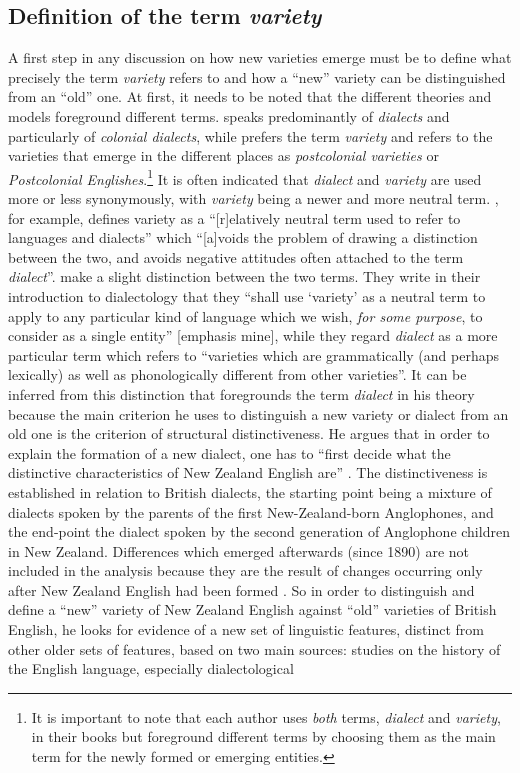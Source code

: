\subsection{Definition of the term \textit{variety}}
\label{bkm:Ref521000690}\hypertarget{Toc63021207}{}
A first step in any discussion on how new varieties emerge must be to define what precisely the term \textit{variety} refers to and how a “new” variety can be distinguished from an “old” one. At first, it needs to be noted that the different theories and models foreground different terms. \citet{Trudgill2004} speaks predominantly of \textit{dialects} and particularly of \textit{colonial dialects}, while \citet{Schneider2007} prefers the term \textit{variety} and refers to the varieties that emerge in the different places as \textit{postcolonial varieties} or \textit{Postcolonial Englishes}.\footnote{It is important to note that each author uses \emph{both} terms, \textit{dialect} and \textit{variety}, in their books but foreground different terms by choosing them as the main term for the newly formed or emerging entities.}  It is often indicated that \textit{dialect} and \textit{variety} are used more or less synonymously, with \textit{variety} being a newer and more neutral term. \citet[32]{Meyerhoff2011}, for example, defines variety as a “[r]elatively neutral term used to refer to languages and dialects” which “[a]voids the problem of drawing a distinction between the two, and avoids negative attitudes often attached to the term \emph{dialect}”. \citet[5]{Chambers1998} make a slight distinction between the two terms. They write in their introduction to dialectology that they “shall use ‘variety’ as a neutral term to apply to any particular kind of language which we wish, \emph{for some purpose}, to consider as a single entity” [emphasis mine], while they regard \textit{dialect} as a more particular term which refers to “varieties which are grammatically (and perhaps lexically) as well as phonologically different from other varieties”. It can be inferred from this distinction that \citet{Trudgill2004} foregrounds the term \textit{dialect} in his theory because the main criterion he uses to distinguish a new variety or dialect from an old one is the criterion of structural distinctiveness. He argues that in order to explain the formation of a new dialect, one has to “first decide what the distinctive characteristics of New Zealand English are” \citep[31]{Trudgill2004}. The distinctiveness is established in relation to British dialects, the starting point being a mixture of dialects spoken by the parents of the first New-Zealand-born Anglophones, and the end-point the dialect spoken by the second generation of Anglophone children in New Zealand. Differences which emerged afterwards (since 1890) are not included in the analysis because they are the result of changes occurring only after New Zealand English had been formed \citep[32]{Trudgill2004}. So in order to distinguish and define a “new” variety of New Zealand English against “old” varieties of British English, he looks for evidence of a new set of linguistic features, distinct from other older sets of features, based on two main sources: studies on the history of the English language, especially dialectological 